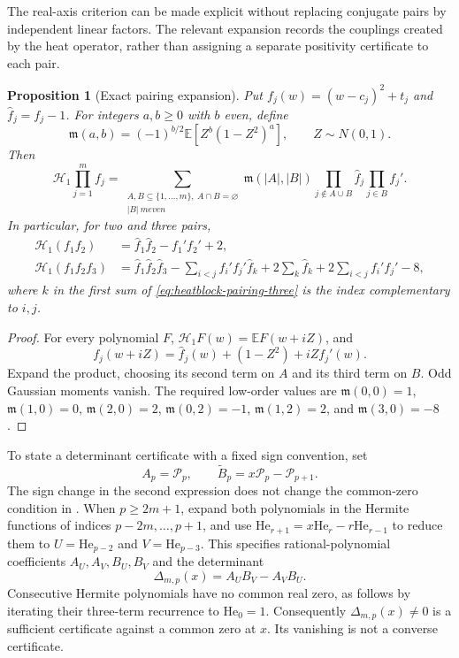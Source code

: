 \documentclass[11pt]{article}
\newtheorem{proposition}[theorem]{Proposition}
\theoremstyle{definition}
\theoremstyle{remark}
\newcommand{\E}{\mathbb E}
\begin{document}
The real-axis criterion can be made explicit without replacing conjugate
pairs by independent linear factors.  The relevant expansion records the
couplings created by the heat operator, rather than assigning a separate
positivity certificate to each pair.

\begin{proposition}[Exact pairing expansion]
\label{prop:heatblock-pairing}
Put $f_j(w)=(w-c_j)^2+t_j$ and $\widehat f_j=f_j-1$.  For integers
$a,b\ge0$ with $b$ even, define
\[
 \mathfrak m(a,b)=(-1)^{b/2}\E[Z^b(1-Z^2)^a],\qquad Z\sim N(0,1).
\]
Then
\begin{equation}
 \mathcal H_1\prod_{j=1}^m f_j
 =\sum_{\substack{A,B\subseteq\{1,\ldots,m\}\!,\ A\cap B=\varnothing\\
                   |B|\ {
m even}}}
 \mathfrak m(|A|,|B|)
 \prod_{j\notin A\cup B}\widehat f_j
 \prod_{j\in B}f_j'.
 \label{eq:heatblock-pairing}
\end{equation}
In particular, for two and three pairs,
\begin{align}
 \mathcal H_1(f_1f_2)
 &=\widehat f_1\widehat f_2-f_1'f_2'+2,
 \label{eq:heatblock-pairing-two}\\
 \mathcal H_1(f_1f_2f_3)
 &=\widehat f_1\widehat f_2\widehat f_3
   -\sum_{i<j}f_i'f_j'\widehat f_k
   +2\sum_k\widehat f_k+2\sum_{i<j}f_i'f_j'-8,
 \label{eq:heatblock-pairing-three}
\end{align}
where $k$ in the first sum of \eqref{eq:heatblock-pairing-three}
is the index complementary to $i,j$.
\end{proposition}

\begin{proof}
For every polynomial $F$, $\mathcal H_1F(w)=\E F(w+iZ)$, and
\[
 f_j(w+iZ)=\widehat f_j(w)+(1-Z^2)+iZf_j'(w).
\]
Expand the product, choosing its second term on $A$ and its third term
on $B$.  Odd Gaussian moments vanish.  The required low-order values are
$\mathfrak m(0,0)=1$, $\mathfrak m(1,0)=0$,
$\mathfrak m(2,0)=2$, $\mathfrak m(0,2)=-1$,
$\mathfrak m(1,2)=2$, and $\mathfrak m(3,0)=-8$.
\end{proof}

To state a determinant certificate with a fixed sign convention, set
\[
 A_p=\mathcal P_p,\qquad
 \widetilde B_p=x\mathcal P_p-\mathcal P_{p+1}.
\]
The sign change in the second expression does not change the common-zero
condition in .  When $p\ge2m+1$, expand
both polynomials in the Hermite functions of indices
$p-2m,\ldots,p+1$, and use
$\mathrm{He}_{r+1}=x\mathrm{He}_r-r\mathrm{He}_{r-1}$ to reduce them to
$U=\mathrm{He}_{p-2}$ and $V=\mathrm{He}_{p-3}$.  This specifies
rational-polynomial coefficients $A_U,A_V,B_U,B_V$ and the determinant
\begin{equation}
 \Delta_{m,p}(x)=A_U B_V-A_V B_U.
 \label{eq:heatblock-determinant-convention}
\end{equation}
Consecutive Hermite polynomials have no common real zero, as follows
by iterating their three-term recurrence to $\mathrm{He}_0=1$.
Consequently $\Delta_{m,p}(x)\ne0$ is a sufficient certificate against
a common zero at $x$.  Its vanishing is not a converse certificate.
\end{document}
